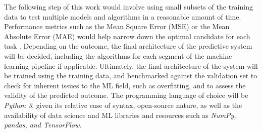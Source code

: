 \documentclass[main.tex]{subfiles}
\begin{document}
The following step of this work would involve using small subsets of the training data to test multiple models and algorithms in a reasonable amount of time. Performance metrics such as the Mean Square Error (MSE) or the Mean Absolute Error (MAE) would help narrow down the optimal candidate for each task \cite{Geron2019}. Depending on the outcome, the final architecture of the predictive system will be decided, including the algorithms for each segment of the machine learning pipeline if applicable. Ultimately, the final architecture of the system will be trained using the training data, and benchmarked against the validation set to check for inherent issues to the ML field, such as overfitting, and to assess the validity of the predicted outcome. The programming language of choice will be \emph{Python 3}, given its relative ease of syntax, open-source nature, as well as the availability of data science and ML libraries and resources such as \emph{NumPy, pandas, and TensorFlow}.


% 
%
%
%
%
%

\end{document}

